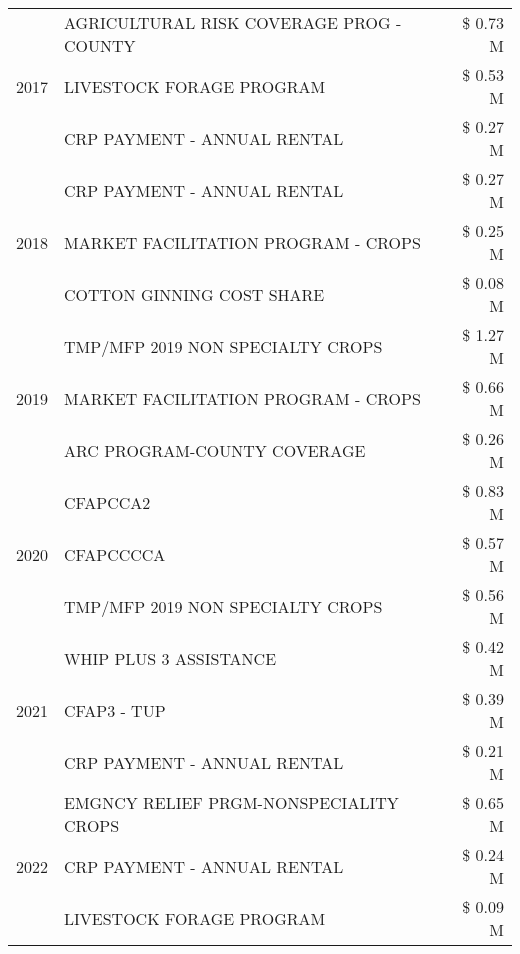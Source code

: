 \begin{tabular}{llr}
\cline{1-3}
\multirow[t]{3}{*}{2017} & AGRICULTURAL RISK COVERAGE PROG - COUNTY & \$ 0.73 M \\
 & LIVESTOCK FORAGE PROGRAM & \$ 0.53 M \\
 & CRP PAYMENT - ANNUAL RENTAL & \$ 0.27 M \\
\cline{1-3}
\multirow[t]{3}{*}{2018} & CRP PAYMENT - ANNUAL RENTAL & \$ 0.27 M \\
 & MARKET FACILITATION PROGRAM - CROPS & \$ 0.25 M \\
 & COTTON GINNING COST SHARE & \$ 0.08 M \\
\cline{1-3}
\multirow[t]{3}{*}{2019} & TMP/MFP 2019 NON SPECIALTY CROPS & \$ 1.27 M \\
 & MARKET FACILITATION PROGRAM - CROPS & \$ 0.66 M \\
 & ARC PROGRAM-COUNTY COVERAGE & \$ 0.26 M \\
\cline{1-3}
\multirow[t]{3}{*}{2020} & CFAPCCA2 & \$ 0.83 M \\
 & CFAPCCCCA & \$ 0.57 M \\
 & TMP/MFP 2019 NON SPECIALTY CROPS & \$ 0.56 M \\
\cline{1-3}
\multirow[t]{3}{*}{2021} & WHIP PLUS 3 ASSISTANCE & \$ 0.42 M \\
 & CFAP3 - TUP & \$ 0.39 M \\
 & CRP PAYMENT - ANNUAL RENTAL & \$ 0.21 M \\
\cline{1-3}
\multirow[t]{3}{*}{2022} & EMGNCY RELIEF PRGM-NONSPECIALITY CROPS & \$ 0.65 M \\
 & CRP PAYMENT - ANNUAL RENTAL & \$ 0.24 M \\
 & LIVESTOCK FORAGE PROGRAM & \$ 0.09 M \\
\cline{1-3}
\bottomrule
\end{tabular}
